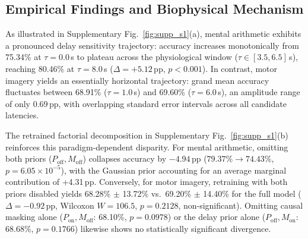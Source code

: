 \documentclass[journal]{IEEEtran}
\begin{document}
\subsection{Empirical Findings and Biophysical Mechanism}
As illustrated in Supplementary Fig.~\ref{fig:supp_s1}(a), mental arithmetic exhibits a pronounced delay sensitivity trajectory: accuracy increases monotonically from 75.34\% at $\tau = 0.0$\,s to plateau across the physiological window ($\tau \in [3.5, 6.5]$\,s), reaching 80.46\% at $\tau = 8.0$\,s ($\Delta = +5.12$\,pp, $p < 0.001$). In contrast, motor imagery yields an essentially horizontal trajectory: grand mean accuracy fluctuates between 68.91\% ($\tau = 1.0$\,s) and 69.60\% ($\tau = 6.0$\,s), an amplitude range of only 0.69\,pp, with overlapping standard error intervals across all candidate latencies.

The retrained factorial decomposition in Supplementary Fig.~\ref{fig:supp_s1}(b) reinforces this paradigm-dependent disparity. For mental arithmetic, omitting both priors ($P_{\mathrm{off}}, M_{\mathrm{off}}$) collapses accuracy by $-4.94$\,pp ($79.37\% \to 74.43\%$, $p = 6.05 \times 10^{-5}$), with the Gaussian prior accounting for an average marginal contribution of +4.31\,pp. Conversely, for motor imagery, retraining with both priors disabled yields 68.28\% $\pm$ 13.72\% vs.\ 69.20\% $\pm$ 14.40\% for the full model ($\Delta = -0.92$\,pp, Wilcoxon $W = 106.5$, $p = 0.2128$, non-significant). Omitting causal masking alone ($P_{\mathrm{on}}, M_{\mathrm{off}}$: 68.10\%, $p = 0.0978$) or the delay prior alone ($P_{\mathrm{off}}, M_{\mathrm{on}}$: 68.68\%, $p = 0.1766$) likewise shows no statistically significant divergence.
\end{document}
